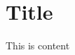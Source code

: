 \documentclass{article}
\begin{document}
 
\ \\ \vspace{-0.6cm}

	\section{Title}

	This is content
	
\end{document}
